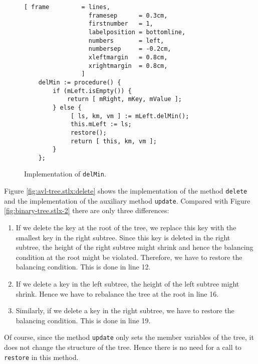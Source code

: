 \begin{figure}[!ht]
\centering
\begin{Verbatim}[ frame         = lines, 
                  framesep      = 0.3cm, 
                  firstnumber   = 1,
                  labelposition = bottomline,
                  numbers       = left,
                  numbersep     = -0.2cm,
                  xleftmargin   = 0.8cm,
                  xrightmargin  = 0.8cm,
                ]
    delMin := procedure() {
        if (mLeft.isEmpty()) { 
            return [ mRight, mKey, mValue ]; 
        } else {
             [ ls, km, vm ] := mLeft.delMin();
             this.mLeft := ls;
             restore();
             return [ this, km, vm ];
        }
    };
\end{Verbatim}
\vspace*{-0.3cm}
\caption{Implementation of \texttt{delMin}.}
\label{fig:avl-tree.stlx:delMin}
\end{figure}

\pagebreak
Figure \ref{fig:avl-tree.stlx:delete} shows the implementation of the method \texttt{delete} and the
implementation of the auxiliary method \texttt{update}.  Compared with Figure
\ref{fig:binary-tree.stlx-2} there are only three differences:
\begin{enumerate}
\item If we delete the key at the root of the tree, we replace this key with the smallest key in the
      right subtree. Since this key is deleted in the right subtree, the height of the right
      subtree might shrink and hence the balancing condition at the root might be violated.
      Therefore, we have to restore the balancing condition.  This is done in line 12.
\item If we delete a key in the left subtree, the height of the left subtree might shrink.
      Hence we have to rebalance the tree at the root in line 16.
\item Similarly, if we delete a key in the right subtree, we have to restore the balancing
      condition.  This is done in line 19.
\end{enumerate}
Of course, since the method \texttt{update} only sets the member variables of the tree, it does not
change the structure of the tree.  Hence there is no need for a call to \texttt{restore} in this method.


